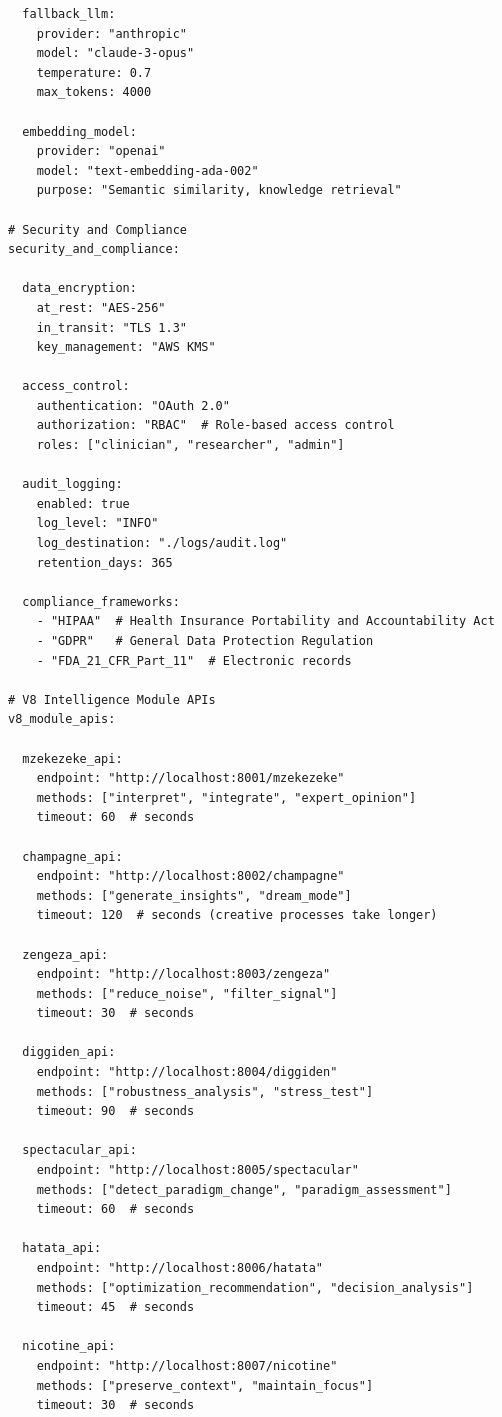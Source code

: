 \begin{verbatim}
  fallback_llm:
    provider: "anthropic"
    model: "claude-3-opus"
    temperature: 0.7
    max_tokens: 4000
  
  embedding_model:
    provider: "openai"
    model: "text-embedding-ada-002"
    purpose: "Semantic similarity, knowledge retrieval"

# Security and Compliance
security_and_compliance:
  
  data_encryption:
    at_rest: "AES-256"
    in_transit: "TLS 1.3"
    key_management: "AWS KMS"
  
  access_control:
    authentication: "OAuth 2.0"
    authorization: "RBAC"  # Role-based access control
    roles: ["clinician", "researcher", "admin"]
  
  audit_logging:
    enabled: true
    log_level: "INFO"
    log_destination: "./logs/audit.log"
    retention_days: 365
  
  compliance_frameworks:
    - "HIPAA"  # Health Insurance Portability and Accountability Act
    - "GDPR"   # General Data Protection Regulation
    - "FDA_21_CFR_Part_11"  # Electronic records

# V8 Intelligence Module APIs
v8_module_apis:
  
  mzekezeke_api:
    endpoint: "http://localhost:8001/mzekezeke"
    methods: ["interpret", "integrate", "expert_opinion"]
    timeout: 60  # seconds
  
  champagne_api:
    endpoint: "http://localhost:8002/champagne"
    methods: ["generate_insights", "dream_mode"]
    timeout: 120  # seconds (creative processes take longer)
  
  zengeza_api:
    endpoint: "http://localhost:8003/zengeza"
    methods: ["reduce_noise", "filter_signal"]
    timeout: 30  # seconds
  
  diggiden_api:
    endpoint: "http://localhost:8004/diggiden"
    methods: ["robustness_analysis", "stress_test"]
    timeout: 90  # seconds
  
  spectacular_api:
    endpoint: "http://localhost:8005/spectacular"
    methods: ["detect_paradigm_change", "paradigm_assessment"]
    timeout: 60  # seconds
  
  hatata_api:
    endpoint: "http://localhost:8006/hatata"
    methods: ["optimization_recommendation", "decision_analysis"]
    timeout: 45  # seconds
  
  nicotine_api:
    endpoint: "http://localhost:8007/nicotine"
    methods: ["preserve_context", "maintain_focus"]
    timeout: 30  # seconds
  

\end{verbatim}
